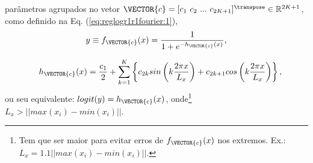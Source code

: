 \begin{theorem}
\begin{minipage}{0.55\textwidth}
parâmetros agrupados no vetor $\VECTOR{c}=[c_1~ c_2~ ...~ c_{2 K+1}]^{\transpose}\in \mathbb{R}^{2 K+1}$,
como definido na Eq. (\ref{eq:reglogr1r1fourier:1}),
\begin{equation}\label{eq:reglogr1r1fourier:1}
y\equiv f_{\VECTOR{c}}(x)= \frac{1}{1+e^{-h_{\VECTOR{c}}(x) }},
\end{equation}
\end{minipage}
\begin{equation}
\quad h_{\VECTOR{c}}(x)=\frac{c_1}{2}+ \sum_{k=1}^{K} \left\{ 
c_{2k} sin\left(k \frac{2 \pi x}{L_x}\right) + 
c_{2k+1} cos\left(k \frac{2 \pi x}{L_x}\right)
\right\},
\end{equation}
ou seu equivalente: $logit(y)=h_{\VECTOR{c}}(x)$, onde\footnote{Tem 
que ser maior para evitar erros de $f_{\VECTOR{c}}(x)$ nos extremos. 
Ex.: $L_x =1.1 || max(x_i)-min(x_i)||$.}
 $L_x > || max(x_i)-min(x_i)||$.


\end{theorem}
